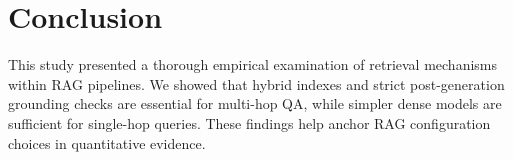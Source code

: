 \documentclass{article}
\begin{document}
\section{Conclusion}
This study presented a thorough empirical examination of retrieval mechanisms within RAG pipelines. We showed that hybrid indexes and strict post-generation grounding checks are essential for multi-hop QA, while simpler dense models are sufficient for single-hop queries. These findings help anchor RAG configuration choices in quantitative evidence.
\end{document}
